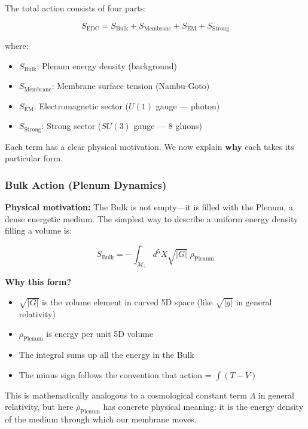 The total action consists of four parts:

\begin{equation}
\boxed{S_{\text{EDC}} = S_{\text{Bulk}} + S_{\text{Membrane}} + S_{\text{EM}} + S_{\text{Strong}}}
\label{eq:total_action}
\end{equation}

where:
\begin{itemize}
    \item $S_{\text{Bulk}}$: Plenum energy density (background)
    \item $S_{\text{Membrane}}$: Membrane surface tension (Nambu-Goto)
    \item $S_{\text{EM}}$: Electromagnetic sector ($U(1)$ gauge — photon)
    \item $S_{\text{Strong}}$: Strong sector ($SU(3)$ gauge — 8 gluons)
\end{itemize}

Each term has a clear physical motivation. We now explain \textbf{why} each takes its particular form.

\subsubsection{Bulk Action (Plenum Dynamics)}

\textbf{Physical motivation:} The Bulk is not empty---it is filled with the Plenum, a dense energetic medium. The simplest way to describe a uniform energy density filling a volume is:

\begin{equation}
S_{\text{Bulk}} = -\int_{\mathcal{M}_5} d^5X \sqrt{|G|} \; \rho_{\text{Plenum}}
\label{eq:bulk_action}
\end{equation}

\textbf{Why this form?}
\begin{itemize}
    \item $\sqrt{|G|}$ is the volume element in curved 5D space (like $\sqrt{|g|}$ in general relativity)
    \item $\rho_{\text{Plenum}}$ is energy per unit 5D volume
    \item The integral sums up all the energy in the Bulk
    \item The minus sign follows the convention that action = $\int (T - V)$
\end{itemize}

This is mathematically analogous to a cosmological constant term $\Lambda$ in general relativity, but here $\rho_{\text{Plenum}}$ has concrete physical meaning: it is the energy density of the medium through which our membrane moves.

